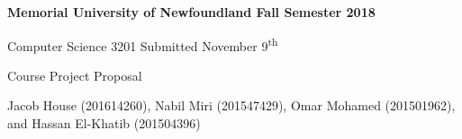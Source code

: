 \documentclass{article}
\begin{document}
	{
		\parindent=0pt
		\bfseries
		Memorial University of Newfoundland \hfill Fall Semester 2018 
		
		Computer Science 3201 \hfill Submitted November 9\textsuperscript{th}
		
		\vskip 2pc
		
		{
			\Large \hfill Course Project Proposal \hfill
		}
	}

	 Jacob House (201614260), Nabil Miri (201547429), Omar Mohamed (201501962), and Hassan El-Khatib (201504396)
	
	
	
	
	
\end{document}

